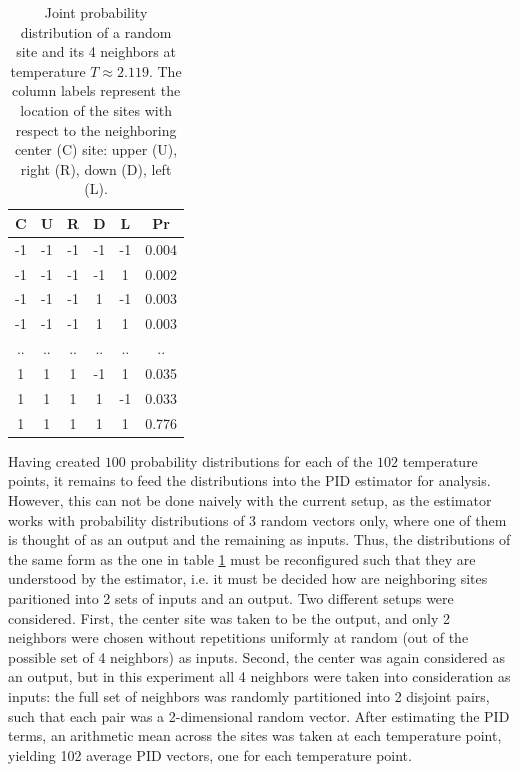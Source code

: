 \documentclass[12pt]{article}
\begin{document}
\begin{table}[h!]
\centering
\begin{tabular}{c c c c c c}
	\hline
	C & U & R & D & L & Pr\\ 
	\hline
	-1 & -1 & -1 & -1 & -1 & 0.004 \\
	-1 & -1 & -1 & -1 & 1 & 0.002 \\
	-1 & -1 & -1 & 1 & -1 & 0.003 \\
	-1 & -1 & -1 & 1 & 1 & 0.003 \\
	.. & .. & .. &  .. & .. & .. \\
	1 & 1 & 1 & -1 & 1 & 0.035 \\
 	1 & 1 & 1 & 1 & -1 & 0.033 \\
 	1 & 1 & 1 & 1 & 1 & 0.776 \\
 	\hline
\end{tabular}
\caption{Joint probability distribution of a random site and its 4 neighbors at temperature $T \approx 2.119$. The column labels represent the location of the sites with respect to the neighboring center (C) site: upper (U), right (R), down (D), left (L).}
\label{table:4}
\end{table}

Having created $100$ probability distributions for each of the $102$ temperature points, it remains to feed the distributions into the PID estimator for analysis. However, this can not be done naively with the current setup, as the estimator works with probability distributions of 3 random vectors only, where one of them is thought of as an output and the remaining as inputs. Thus, the distributions of the same form as the one in table \ref{table:4} must be reconfigured such that they are understood by the estimator, i.e. it must be decided how are neighboring sites paritioned into 2 sets of inputs and an output. Two different setups were considered. First, the center site was taken to be the output, and only 2 neighbors were chosen without repetitions uniformly at random (out of the possible set of 4 neighbors) as inputs. Second, the center was again considered as an output, but in this experiment all 4 neighbors were taken into consideration as inputs: the full set of neighbors was randomly partitioned into 2 disjoint pairs, such that each pair was a 2-dimensional random vector. After estimating the PID terms, an arithmetic mean across the sites was taken at each temperature point, yielding 102 average PID vectors, one for each temperature point. 
\end{document}
